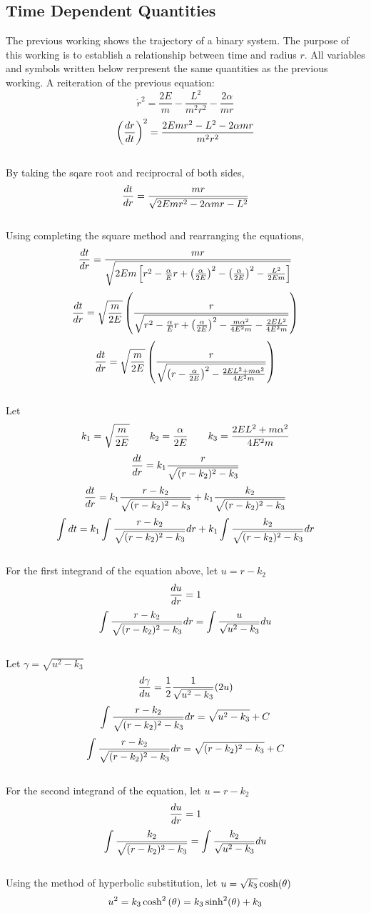 \documentclass[class=report, 12pt, crop=false]{standalone}
\begin{document}
\begin{center}
\section{Time Dependent Quantities}
\begin{comment}
\end{comment}
The previous working shows the trajectory of a binary system. The purpose of this working is to establish a relationship between time and radius $r$. All variables and symbols written below rerpresent the same quantities as the previous working. A reiteration of the previous equation:
$$\dot{r}^2 = \frac{2E}{m}-\frac{L^2}{m^2r^2}-\frac{2\alpha}{mr}$$
$$\left(\frac{dr}{dt}\right)^2  = \frac{2Emr^2 - L^2 - 2 \alpha mr}{m^2 r^2}$$
\\By taking the sqare root and reciprocral of both sides,
$$\frac{dt}{dr} = \frac{mr}{\sqrt{2Emr^2 - 2 \alpha mr - L^2}}$$
\\Using completing the square method and rearranging the equations,
$$\frac{dt}{dr} = \frac{mr}{\sqrt{2Em\left[r^2 - \frac{\alpha}{E}r + \left(\frac{\alpha}{2E}\right)^2 - \left(\frac{\alpha}{2E}\right)^2 -  \frac{L^2}{2Em}\right]}}$$
$$\frac{dt}{dr} = \sqrt{\frac{m}{2E}}\left(\frac{r}{\sqrt{r^2 - \frac{\alpha}{E}r + \left(\frac{\alpha}{2E}\right)^2 - \frac{m\alpha ^ 2}{4 E^2 m} -  \frac{2E L^2}{4 E^2 m}}}\right)$$
$$\frac{dt}{dr} = \sqrt{\frac{m}{2E}}\left(\frac{r}{\sqrt{\left(r - \frac{\alpha}{2E}\right)^2 -  \frac{2E L^2 + m\alpha ^ 2}{4 E^2 m}}}\right)$$
\\Let
$$k_1 = \sqrt{\frac{m}{2E}} \qquad k_2 = \frac{\alpha}{2E} \qquad k_3 = \frac{2E L^2 + m\alpha ^ 2}{4 E^2 m}$$
$$\frac{dt}{dr} = k_1 \frac{r}{\sqrt{(r - k_2)^2 - k_3}}$$
$$\frac{dt}{dr} = k_1 \frac{r - k_2}{\sqrt{(r - k_2)^2 - k_3}} + k_1 \frac{k_2}{\sqrt{(r - k_2)^2 - k_3}}$$
$$\int dt= k_1 \int \frac{r - k_2}{\sqrt{(r - k_2)^2 - k_3}} dr + k_1 \int \frac{k_2}{\sqrt{(r - k_2)^2 - k_3}} dr$$
\\For the first integrand of the equation above, let $u = r - k_2$
$$\frac{du}{dr} = 1$$
$$\int \frac{r - k_2}{\sqrt{(r - k_2)^2 - k_3}} dr = \int \frac{u}{\sqrt{u^2 - k_3}} du$$
\\Let $\gamma = \sqrt{u^2 - k_3}$
$$\frac{d\gamma}{du} = \frac{1}{2}\frac{1}{\sqrt{u^2 - k_3}}(2u)$$
$$\int \frac{r - k_2}{\sqrt{(r - k_2)^2 - k_3}} dr = \sqrt{u^2 - k_3} + C$$
$$\int \frac{r - k_2}{\sqrt{(r - k_2)^2 - k_3}} dr = \sqrt{(r - k_2)^2 - k_3} + C$$
\\For the second integrand of the equation, let $u = r - k_2$
$$\frac{du}{dr} = 1$$
$$\int \frac{k_2}{\sqrt{(r - k_2)^2 - k_3}} = \int \frac{k_2}{\sqrt{u^2 - k_3}} du$$
\\Using the method of hyperbolic substitution, let $u = \sqrt{k_3}\cosh(\theta)$
$$u^2 = k_3\cosh^2\left(\theta\right) = k_3\sinh^2(\theta) + k_3$$

\end{center}
\end{document}
